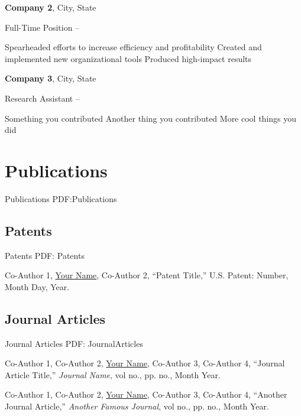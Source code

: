 \documentclass[letterpaper,9pt,oneside]{article}
\begin{document}
\begin{body}
\EntryGap
\textbf{Company 2}, City, State
\par
Full-Time Position
\hfill
{} --
\begin{detail}
\SmallEntryGap
\BulletItem
Spearheaded efforts to increase efficiency and profitability
\BulletItem
Created and implemented new organizational tools
\BulletItem
Produced high-impact results
\end{detail}

\EntryGap
\textbf{Company 3}, City, State
\par
Research Assistant
\hfill
{} --
\begin{detail}
\SmallEntryGap
\BulletItem
Something you contributed
\BulletItem
Another thing you contributed
\BulletItem
More cool things you did
\end{detail}



\section
{Publications}
{Publications}
{PDF:Publications}

\subsection
{Patents}
{Patents}
{PDF: Patents}

Co-Author 1, \underline{Your Name}, Co-Author 2,
``Patent Title,'' U.S. Patent: Number, Month Day, Year.

\EntryGap
\subsection
{Journal Articles}
{Journal Articles}
{PDF: JournalArticles}

Co-Author 1, Co-Author 2, \underline{Your Name}, Co-Author 3, Co-Author 4,
``Journal Article Title,''
\textit{Journal Name}, vol no., pp. no., Month Year.

\EntryGap
Co-Author 1, Co-Author 2, \underline{Your Name}, Co-Author 3, Co-Author 4,
``Another Journal Article,''
\textit{Another Famous Journal}, vol no., pp. no., Month Year.



\end{body}
\end{document}
